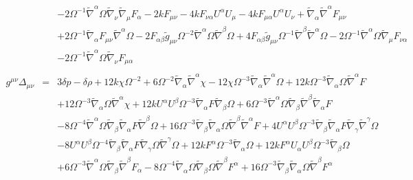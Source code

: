 \documentclass[10pt,letterpaper]{article}
\numberwithin{equation}{section}
\begin{document}
\begin{eqnarray}
&& - 2 \Omega^{-1} \tilde{\nabla}^{\alpha }\Omega \tilde{\nabla}_{\nu }\tilde{\nabla}_{\mu }F_{\alpha }-2 k F_{\mu \nu } - 4 k F_{\nu \alpha } U^{\alpha } U_{\mu } - 4 k F_{\mu \alpha } U^{\alpha } U_{\nu } + \tilde{\nabla}_{\alpha }\tilde{\nabla}^{\alpha }F_{\mu \nu } \nonumber \\ 
&& + 2 \Omega^{-1} \tilde{\nabla}_{\alpha }F_{\mu \nu } \tilde{\nabla}^{\alpha }\Omega - 2 F_{\alpha \beta } \tilde{g}_{\mu \nu } \Omega^{-2} \tilde{\nabla}^{\alpha }\Omega \tilde{\nabla}^{\beta }\Omega + 4 F_{\alpha \beta } \tilde{g}_{\mu \nu } \Omega^{-1} \tilde{\nabla}^{\beta }\tilde{\nabla}^{\alpha }\Omega - 2 \Omega^{-1} \tilde{\nabla}^{\alpha }\Omega \tilde{\nabla}_{\mu }F_{\nu \alpha } \nonumber \\ 
&& - 2 \Omega^{-1} \tilde{\nabla}^{\alpha }\Omega \tilde{\nabla}_{\nu }F_{\mu \alpha }
\\  \nonumber\\ 
g^{\mu\nu}\Delta_{\mu\nu}&=& 3 \delta p -  \delta \rho + 12 k \chi \Omega^{-2} + 6 \Omega^{-2} \tilde{\nabla}_{\alpha }\tilde{\nabla}^{\alpha }\chi - 12 \chi \Omega^{-3} \tilde{\nabla}_{\alpha }\tilde{\nabla}^{\alpha }\Omega + 12 k \Omega^{-3} \tilde{\nabla}_{\alpha }\Omega \tilde{\nabla}^{\alpha }F \nonumber \\ 
&& + 12 \Omega^{-3} \tilde{\nabla}_{\alpha }\Omega \tilde{\nabla}^{\alpha }\chi + 12 k U^{\alpha } U^{\beta } \Omega^{-3} \tilde{\nabla}_{\alpha }F \tilde{\nabla}_{\beta }\Omega + 6 \Omega^{-3} \tilde{\nabla}^{\alpha }\Omega \tilde{\nabla}_{\beta }\tilde{\nabla}^{\beta }\tilde{\nabla}_{\alpha }F \nonumber \\ 
&& - 8 \Omega^{-4} \tilde{\nabla}^{\alpha }\Omega \tilde{\nabla}_{\beta }\tilde{\nabla}_{\alpha }F \tilde{\nabla}^{\beta }\Omega + 16 \Omega^{-3} \tilde{\nabla}_{\beta }\tilde{\nabla}_{\alpha }\Omega \tilde{\nabla}^{\beta }\tilde{\nabla}^{\alpha }F + 4 U^{\alpha } U^{\beta } \Omega^{-3} \tilde{\nabla}_{\beta }\tilde{\nabla}_{\alpha }F \tilde{\nabla}_{\gamma }\tilde{\nabla}^{\gamma }\Omega \nonumber \\ 
&& - 8 U^{\alpha } U^{\beta } \Omega^{-4} \tilde{\nabla}_{\beta }\tilde{\nabla}_{\alpha }F \tilde{\nabla}_{\gamma }\Omega \tilde{\nabla}^{\gamma }\Omega +12 k F^{\alpha } \Omega^{-3} \tilde{\nabla}_{\alpha }\Omega + 12 k F^{\alpha } U_{\alpha } U^{\beta } \Omega^{-3} \tilde{\nabla}_{\beta }\Omega \nonumber \\ 
&& + 6 \Omega^{-3} \tilde{\nabla}^{\alpha }\Omega \tilde{\nabla}_{\beta }\tilde{\nabla}^{\beta }F_{\alpha } - 8 \Omega^{-4} \tilde{\nabla}_{\alpha }\Omega \tilde{\nabla}_{\beta }\Omega \tilde{\nabla}^{\beta }F^{\alpha } + 16 \Omega^{-3} \tilde{\nabla}_{\beta }\tilde{\nabla}_{\alpha }\Omega \tilde{\nabla}^{\beta }F^{\alpha } \nonumber \\ 

\end{eqnarray}
\end{document}
